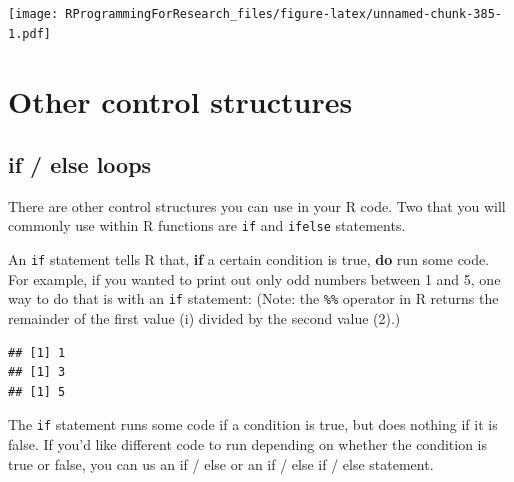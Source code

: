 \documentclass[]{book}
\makeatletter
\newenvironment{Shaded}{\begin{snugshade}}{\end{snugshade}}
\newcommand{\KeywordTok}[1]{\textcolor[rgb]{0.13,0.29,0.53}{\textbf{#1}}}
\newcommand{\DecValTok}[1]{\textcolor[rgb]{0.00,0.00,0.81}{#1}}
\newcommand{\StringTok}[1]{\textcolor[rgb]{0.31,0.60,0.02}{#1}}
\newcommand{\ControlFlowTok}[1]{\textcolor[rgb]{0.13,0.29,0.53}{\textbf{#1}}}
\newcommand{\OperatorTok}[1]{\textcolor[rgb]{0.81,0.36,0.00}{\textbf{#1}}}
\newcommand{\NormalTok}[1]{#1}
\newenvironment{kframe}{%
\medskip{}
\setlength{\fboxsep}{.8em}
 \def\at@end@of@kframe{}%
 \ifinner\ifhmode%
  \def\at@end@of@kframe{\end{minipage}}%
  \begin{minipage}{\columnwidth}%
 \fi\fi%
 \def\FrameCommand##1{\hskip\@totalleftmargin \hskip-\fboxsep
 \colorbox{shadecolor}{##1}\hskip-\fboxsep
     \hskip-\linewidth \hskip-\@totalleftmargin \hskip\columnwidth}%
 \MakeFramed {\advance\hsize-\width
   \@totalleftmargin\z@ \linewidth\hsize
   \@setminipage}}%
 {\par\unskip\endMakeFramed%
 \at@end@of@kframe}
\renewenvironment{Shaded}{\begin{kframe}}{\end{kframe}}
\theoremstyle{definition}
\theoremstyle{definition}
\theoremstyle{definition}
\theoremstyle{remark}
\makeatother
\begin{document}
\texttt{[image: RProgrammingForResearch\_files/figure-latex/unnamed-chunk-385-1.pdf]}

\section{Other control structures}\label{other-control-structures}

\subsection{if / else loops}\label{if-else-loops}

There are other control structures you can use in your R code. Two that
you will commonly use within R functions are \texttt{if} and
\texttt{ifelse} statements. \bigskip

An \texttt{if} statement tells R that, \textbf{if} a certain condition
is true, \textbf{do} run some code. For example, if you wanted to print
out only odd numbers between 1 and 5, one way to do that is with an
\texttt{if} statement: (Note: the \texttt{\%\%} operator in R returns
the remainder of the first value (i) divided by the second value (2).)

\begin{Shaded}
\end{Shaded}

\begin{verbatim}
## [1] 1
## [1] 3
## [1] 5
\end{verbatim}

The \texttt{if} statement runs some code if a condition is true, but
does nothing if it is false. If you'd like different code to run
depending on whether the condition is true or false, you can us an if /
else or an if / else if / else statement.

\begin{Shaded}
\end{Shaded}
\end{document}
